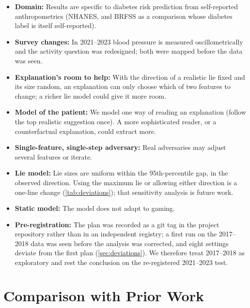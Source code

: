 \documentclass[12pt, a4paper, oneside]{report}
\theoremstyle{definition}
\begin{document}
\begin{itemize}
  \item \textbf{Domain:} Results are specific to diabetes risk
        prediction from self-reported anthropometrics (NHANES, and BRFSS
        as a comparison whose diabetes label is itself self-reported).
  \item \textbf{Survey changes:} In 2021--2023 blood pressure is
        measured oscillometrically and the activity question was
        redesigned; both were mapped before the data was seen.
  \item \textbf{Explanation's room to help:} With the direction of a
        realistic lie fixed and its size random, an explanation can
        only choose which of two features to change; a richer lie model
        could give it more room.
  \item \textbf{Model of the patient:} We model one way of reading an
        explanation (follow the top realistic suggestion once). A more
        sophisticated reader, or a counterfactual explanation, could
        extract more.
  \item \textbf{Single-feature, single-step adversary:} Real adversaries
        may adjust several features or iterate.
  \item \textbf{Lie model:} Lie sizes are uniform within the
        95th-percentile gap, in the observed direction. Using the
        maximum lie or allowing either direction is a one-line change
        (\cref{tab:deviations}); that sensitivity analysis is future work.
  \item \textbf{Static model:} The model does not adapt to gaming.
  \item \textbf{Pre-registration:} The plan was recorded as a git tag in
        the project repository rather than in an independent registry;
        a first run on the 2017--2018 data was seen before the analysis
        was corrected, and eight settings deviate from the first plan
        (\cref{sec:deviations}). We therefore treat 2017--2018 as
        exploratory and rest the conclusion on the re-registered
        2021--2023 test.
\end{itemize}

\section{Comparison with Prior Work}
\end{document}
